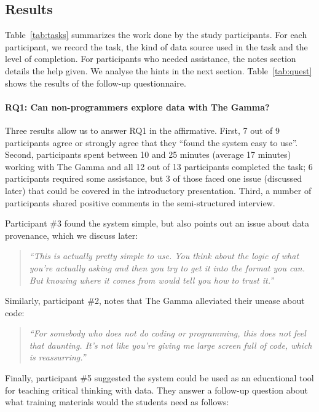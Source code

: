 \documentclass{sigchi}
\begin{document}
\subsection{Results}
Table~\ref{tab:tasks} summarizes the work done by the study participants.
For each participant, we record the task, the kind of data source used in the task and the
level of completion. For participants who needed assistance, the notes section details the help
given. We analyse the hints in the next section. Table~\ref{tab:quest} shows the results of the
follow-up questionnaire.

\paragraph{RQ1: Can non-programmers explore data with The Gamma?}
Three results allow us to answer RQ1 in the affirmative. First, 7 out of 9
participants agree or strongly agree that they ``found the system easy to use''. Second,
participants spent between 10 and 25 minutes (average 17 minutes) working with The Gamma and
all 12 out of 13 participants completed the task; 6 participants required some assistance,
but 3 of those faced one issue (discussed later) that could be covered in the introductory
presentation. Third, a number of participants shared positive comments in the semi-structured
interview.

Participant \#3 found the system simple, but also points out an issue about data provenance,
which we discuss later:

\begin{quote}
\emph{``This is actually pretty simple to use. You think about the logic of what you're actually
  asking and then you try to get it into the format you can. But knowing where it comes from
  would tell you how to trust it.''}
\end{quote}

Similarly, participant \#2, notes that The Gamma alleviated their unease about code:

\begin{quote}
\emph{``For somebody who does not do coding or programming, this does not feel that daunting.
  It's not like you're giving me large screen full of code, which is reassurring.''}
\end{quote}

Finally, participant \#5 suggested the system could be used as an educational tool for teaching
critical thinking with data. They answer a follow-up question about what training materials would
the students need as follows:
\end{document}
